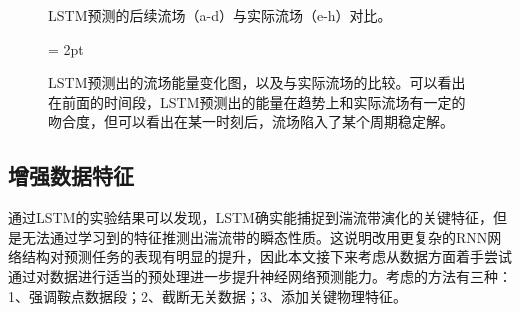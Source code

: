 \begin{figure}[H]
	\begin{minipage}[h]{0.24\linewidth}
	\centering
	\end{minipage}
	\begin{minipage}[h]{0.24\linewidth}
	\centering
	\end{minipage}
	\begin{minipage}[h]{0.24\linewidth}
	\centering
	\end{minipage}
	\begin{minipage}[h]{0.24\linewidth}
	\centering
	\end{minipage}
	\caption{LSTM预测的后续流场（a-d）与实际流场（e-h）对比。}
\label{fig:lstm_purepred}
\end{figure}

\begin{figure}[H]
	\subfigbottomskip = 2pt
	\begin{minipage}[h]{\linewidth}
	\centering
	\end{minipage}
	\caption{LSTM预测出的流场能量变化图，以及与实际流场的比较。可以看出在前面的时间段，LSTM预测出的能量在趋势上和实际流场有一定的吻合度，但可以看出在某一时刻后，流场陷入了某个周期稳定解。}
\label{fig:lstm_purepred_eny}
\end{figure}

\subsection{增强数据特征}
通过LSTM的实验结果可以发现，LSTM确实能捕捉到湍流带演化的关键特征，但是无法通过学习到的特征推测出湍流带的瞬态性质。这说明改用更复杂的RNN网络结构对预测任务的表现有明显的提升，因此本文接下来考虑从数据方面着手尝试通过对数据进行适当的预处理进一步提升神经网络预测能力。考虑的方法有三种：1、强调鞍点数据段；2、截断无关数据；3、添加关键物理特征。
